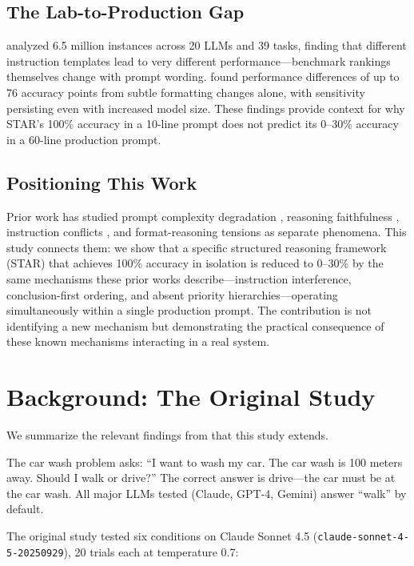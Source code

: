 \documentclass[11pt]{article}
\begin{document}
\subsection{The Lab-to-Production Gap}

\citet{mizrahi2024} analyzed 6.5 million instances across 20 LLMs and 39 tasks, finding that different instruction templates lead to very different performance---benchmark rankings themselves change with prompt wording. \citet{sclar2024} found performance differences of up to 76 accuracy points from subtle formatting changes alone, with sensitivity persisting even with increased model size. These findings provide context for why STAR's 100\% accuracy in a 10-line prompt does not predict its 0--30\% accuracy in a 60-line production prompt.

\subsection{Positioning This Work}

Prior work has studied prompt complexity degradation \citep{dimaio2025, jaroslawicz2025}, reasoning faithfulness \citep{lanham2023, turpin2023}, instruction conflicts \citep{wallace2024, geng2025}, and format-reasoning tensions \citep{tam2024} as separate phenomena. This study connects them: we show that a specific structured reasoning framework (STAR) that achieves 100\% accuracy in isolation is reduced to 0--30\% by the same mechanisms these prior works describe---instruction interference, conclusion-first ordering, and absent priority hierarchies---operating simultaneously within a single production prompt. The contribution is not identifying a new mechanism but demonstrating the practical consequence of these known mechanisms interacting in a real system.

\section{Background: The Original Study}

We summarize the relevant findings from \citet{jo2026} that this study extends.

The car wash problem asks: ``I want to wash my car. The car wash is 100 meters away. Should I walk or drive?'' The correct answer is drive---the car must be at the car wash. All major LLMs tested (Claude, GPT-4, Gemini) answer ``walk'' by default.

The original study tested six conditions on Claude Sonnet 4.5 (\texttt{claude-sonnet-4-5-20250929}), 20 trials each at temperature 0.7:
\end{document}
